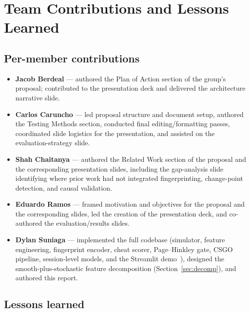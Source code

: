 \documentclass[conference,10pt]{IEEEtran}
\begin{document}
\section{Team Contributions and Lessons Learned}

\subsection{Per-member contributions}

\begin{itemize}
  \item \textbf{Jacob Berdeal} --- authored the Plan of Action section of
    the group's proposal; contributed to the presentation deck and
    delivered the architecture narrative slide.
  \item \textbf{Carlos Caruncho} --- led proposal structure and document
    setup, authored the Testing Methods section, conducted final
    editing/formatting passes, coordinated slide logistics for the
    presentation, and assisted on the evaluation-strategy slide.
  \item \textbf{Shah Chaitanya} --- authored the Related Work section of
    the proposal and the corresponding presentation slides, including
    the gap-analysis slide identifying where prior work had not
    integrated fingerprinting, change-point detection, and causal
    validation.
  \item \textbf{Eduardo Ramos} --- framed motivation and objectives for
    the proposal and the corresponding slides, led the creation of the
    presentation deck, and co-authored the evaluation/results slides.
  \item \textbf{Dylan Suniaga} --- implemented the full codebase (simulator,
    feature engineering, fingerprint encoder, cheat scorer, Page--Hinkley
    gate, CSGO pipeline, session-level models, and the Streamlit
    demo~\cite{streamlit}), designed the smooth-plus-stochastic feature
    decomposition (Section~\ref{sec:decomp}), and authored this report.
\end{itemize}

\subsection{Lessons learned}
\end{document}
